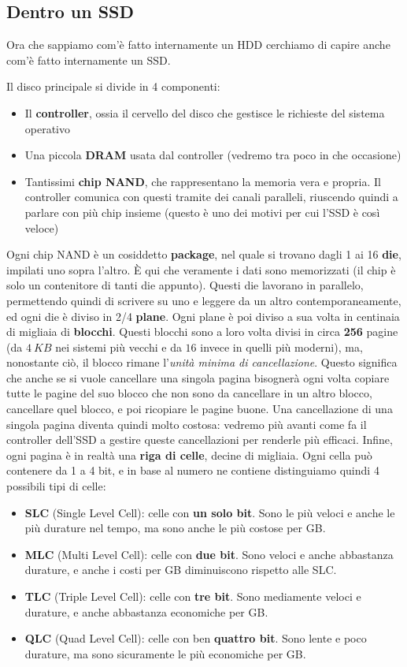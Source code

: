 \documentclass[11pt, a4paper, titlepage, oneside]{scrbook}
\begin{document}
\subsection{Dentro un SSD}

Ora che sappiamo com'è fatto internamente un HDD cerchiamo di capire anche com'è fatto internamente un SSD. 

Il disco principale si divide in 4 componenti:
\begin{itemize}
    \item Il \textbf{controller}, ossia il cervello del disco che gestisce le richieste del sistema operativo
    \item Una piccola \textbf{DRAM} usata dal controller (vedremo tra poco in che occasione)
    \item Tantissimi \textbf{chip NAND}, che rappresentano la memoria vera e propria. Il controller comunica con questi tramite dei canali paralleli, riuscendo quindi a parlare con più chip insieme (questo è uno dei motivi per cui l'SSD è così veloce)
\end{itemize}

Ogni chip NAND è un cosiddetto \textbf{package}, nel quale si trovano dagli 1 ai 16 \textbf{die}, impilati uno sopra l'altro. È qui che veramente i dati sono memorizzati (il chip è solo un contenitore di tanti die appunto). Questi die lavorano in parallelo, permettendo quindi di scrivere su uno e leggere da un altro contemporaneamente, ed ogni die è diviso in 2/4 \textbf{plane}. Ogni plane è poi diviso a sua volta in centinaia di migliaia di \textbf{blocchi}. Questi blocchi sono a loro volta divisi in circa \textbf{256} pagine (da $\SI{4}{KB}$ nei sistemi più vecchi e da $16$ invece in quelli più moderni), ma, nonostante ciò, il blocco rimane l'\textit{unità minima di cancellazione}. Questo significa che anche se si vuole cancellare una singola pagina bisognerà ogni volta copiare tutte le pagine del suo blocco che non sono da cancellare in un altro blocco, cancellare quel blocco, e poi ricopiare le pagine buone. Una cancellazione di una singola pagina diventa quindi molto costosa: vedremo più avanti come fa il controller dell'SSD a gestire queste cancellazioni per renderle più efficaci. Infine, ogni pagina è in realtà una \textbf{riga di celle}, decine di migliaia. Ogni cella può contenere da 1 a 4 bit, e in base al numero ne contiene distinguiamo quindi 4 possibili tipi di celle:
\begin{itemize}
    \item \textbf{SLC} (Single Level Cell): celle con \textbf{un solo bit}. Sono le più veloci e anche le più durature nel tempo, ma sono anche le più costose per GB.
    \item \textbf{MLC} (Multi Level Cell): celle con \textbf{due bit}. Sono veloci e anche abbastanza durature, e anche i costi per GB diminuiscono rispetto alle SLC.
    \item \textbf{TLC} (Triple Level Cell): celle con \textbf{tre bit}. Sono mediamente veloci e durature, e anche abbastanza economiche per GB.
    \item \textbf{QLC} (Quad Level Cell): celle con ben \textbf{quattro bit}. Sono lente e poco durature, ma sono sicuramente le più economiche per GB.
\end{itemize}
\end{document}
